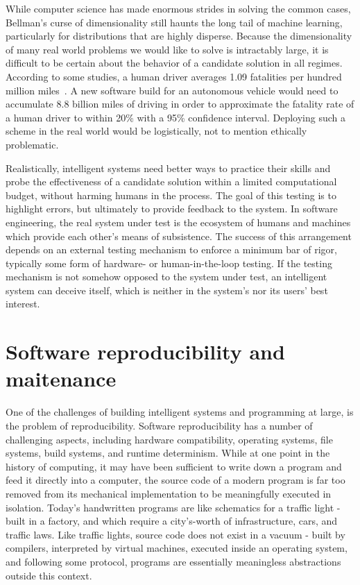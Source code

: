 \documentclass[12pt,initial,twoside,maitrise]{dms}
\numberwithin{equation}{section}
\numberwithin{table}{chapter}
\numberwithin{figure}{chapter}
\begin{document}
While computer science has made enormous strides in solving the common cases, Bellman's curse of dimensionality still haunts the long tail of machine learning, particularly for distributions that are highly disperse. Because the dimensionality of many real world problems we would like to solve is intractably large, it is difficult to be certain about the behavior of a candidate solution in all regimes. According to some studies, a human driver averages 1.09 fatalities per hundred million miles~\cite{kalra2016driving}. A new software build for an autonomous vehicle would need to accumulate 8.8 billion miles of driving in order to approximate the fatality rate of a human driver to within 20\% with a 95\% confidence interval. Deploying such a scheme in the real world would be logistically, not to mention ethically problematic.

Realistically, intelligent systems need better ways to practice their skills and probe the effectiveness of a candidate solution within a limited computational budget, without harming humans in the process. The goal of this testing is to highlight errors, but ultimately to provide feedback to the system. In software engineering, the real system under test is the ecosystem of humans and machines which provide each other's means of subsistence. The success of this arrangement depends on an external testing mechanism to enforce a minimum bar of rigor, typically some form of hardware- or human-in-the-loop testing. If the testing mechanism is not somehow opposed to the system under test, an intelligent system can deceive itself, which is neither in the system's nor its users' best interest.

\section{Software reproducibility and maitenance}

One of the challenges of building intelligent systems and programming at large, is the problem of reproducibility. Software reproducibility has a number of challenging aspects, including hardware compatibility, operating systems, file systems, build systems, and runtime determinism. While at one point in the history of computing, it may have been sufficient to write down a program and feed it directly into a computer, the source code of a modern program is far too removed from its mechanical implementation to be meaningfully executed in isolation. Today's handwritten programs are like schematics for a traffic light - built in a factory, and which require a city's-worth of infrastructure, cars, and traffic laws. Like traffic lights, source code does not exist in a vacuum - built by compilers, interpreted by virtual machines, executed inside an operating system, and following some protocol, programs are essentially meaningless abstractions outside this context.
\end{document}
